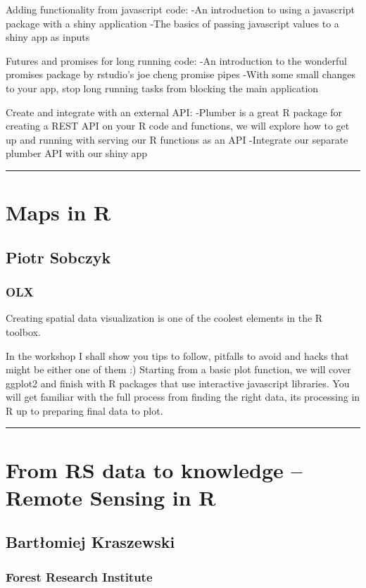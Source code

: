\documentclass [12pt]{article}
\begin{document}
Adding functionality from javascript code: -An introduction to using a javascript package with a shiny application -The basics of passing javascript values to a shiny app as inputs

Futures and promises for long running code: -An introduction to the wonderful promises package by rstudio’s joe cheng promise pipes -With some small changes to your app, stop long running tasks from blocking the main application

Create and integrate with an external API: -Plumber is a great R package for creating a REST API on your R code and functions, we will explore how to get up and running with serving our R functions as an API -Integrate our separate plumber API with our shiny app

\noindent\rule{\textwidth}{1pt}
\section{Maps in R}
\subsection*{Piotr Sobczyk}
\subsubsection*{OLX}

Creating spatial data visualization is one of the coolest elements in the R toolbox.

In the workshop I shall show you tips to follow, pitfalls to avoid and hacks that might be either one of them :) Starting from a basic plot function, we will cover ggplot2 and finish with R packages that use interactive javascript libraries. You will get familiar with the full process from finding the right data, its processing in R up to preparing final data to plot.

\noindent\rule{\textwidth}{1pt}
\section{From RS data to knowledge – Remote Sensing in R}
\subsection*{Bartłomiej	Kraszewski}
\subsubsection*{Forest Research Institute}
\end{document}
